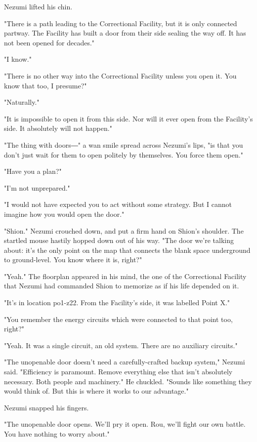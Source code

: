 Nezumi lifted his chin.

"There is a path leading to the Correctional Facility, but it is only
connected partway. The Facility has built a door from their side sealing
the way off. It has not been opened for decades."

"I know."

"There is no other way into the Correctional Facility unless you open
it. You know that too, I presume?"

"Naturally."

"It is impossible to open it from this side. Nor will it ever open from
the Facility's side. It absolutely will not happen."

"The thing with doors―" a wan smile spread across Nezumi's lips, "is
that you don't just wait for them to open politely by themselves. You
force them open."

"Have you a plan?"

"I'm not unprepared."

"I would not have expected you to act without some strategy. But I
cannot imagine how you would open the door."

"Shion." Nezumi crouched down, and put a firm hand on Shion's shoulder.
The startled mouse hastily hopped down out of his way. "The door we're
talking about: it's the only point on the map that connects the blank
space underground to ground-level. You know where it is, right?"

"Yeah." The floorplan appeared in his mind, the one of the Correctional
Facility that Nezumi had commanded Shion to memorize as if his life
depended on it.

"It's in location po1-z22. From the Facility's side, it was labelled
Point X."

"You remember the energy circuits which were connected to that point
too, right?"

"Yeah. It was a single circuit, an old system. There are no auxiliary
circuits."

"The unopenable door doesn't need a carefully-crafted backup system,"
Nezumi said. "Efficiency is paramount. Remove everything else that isn't
absolutely necessary. Both people and machinery." He chuckled. "Sounds
like something they would think of. But this is where it works to our
advantage."

Nezumi snapped his fingers.

"The unopenable door opens. We'll pry it open. Rou, we'll fight our own
battle. You have nothing to worry about."

